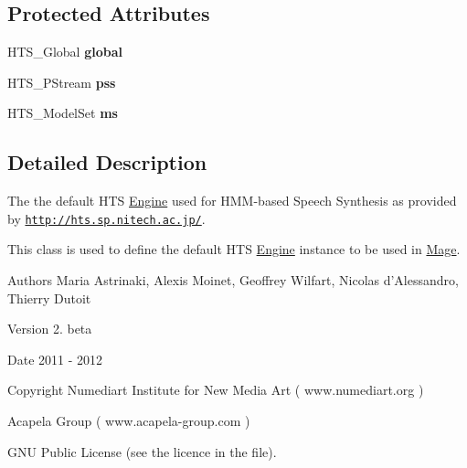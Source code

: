 \subsection*{Protected Attributes}
\begin{DoxyCompactItemize}
\item 
\hypertarget{class_m_a_g_e_1_1_engine_a384e050ced9ebccc4bf37d8c6051900f}{H\-T\-S\-\_\-\-Global {\bfseries global}}\label{class_m_a_g_e_1_1_engine_a384e050ced9ebccc4bf37d8c6051900f}

\item 
\hypertarget{class_m_a_g_e_1_1_engine_a76b2f51be6691017e93b45c2187f8fa5}{H\-T\-S\-\_\-\-P\-Stream {\bfseries pss}}\label{class_m_a_g_e_1_1_engine_a76b2f51be6691017e93b45c2187f8fa5}

\item 
\hypertarget{class_m_a_g_e_1_1_engine_ad26bf0e3d9eeebcdb9917a4f48971fa2}{H\-T\-S\-\_\-\-Model\-Set {\bfseries ms}}\label{class_m_a_g_e_1_1_engine_ad26bf0e3d9eeebcdb9917a4f48971fa2}

\end{DoxyCompactItemize}


\subsection{Detailed Description}
The the default H\-T\-S \hyperlink{class_m_a_g_e_1_1_engine}{Engine} used for H\-M\-M-\/based Speech Synthesis as provided by \href{http://hts.sp.nitech.ac.jp/}{\tt http\-://hts.\-sp.\-nitech.\-ac.\-jp/}. 

This class is used to define the default H\-T\-S \hyperlink{class_m_a_g_e_1_1_engine}{Engine} instance to be used in \hyperlink{class_m_a_g_e_1_1_mage}{Mage}.

\begin{DoxyAuthor}{Authors}
Maria Astrinaki, Alexis Moinet, Geoffrey Wilfart, Nicolas d'Alessandro, Thierry Dutoit
\end{DoxyAuthor}
\begin{DoxyVersion}{Version}
2. beta 
\end{DoxyVersion}
\begin{DoxyDate}{Date}
2011 -\/ 2012 
\end{DoxyDate}
\begin{DoxyCopyright}{Copyright}
Numediart Institute for New Media Art ( www.\-numediart.\-org ) \par
 Acapela Group ( www.\-acapela-\/group.\-com ) \par
 G\-N\-U Public License (see the licence in the file). 
\end{DoxyCopyright}


